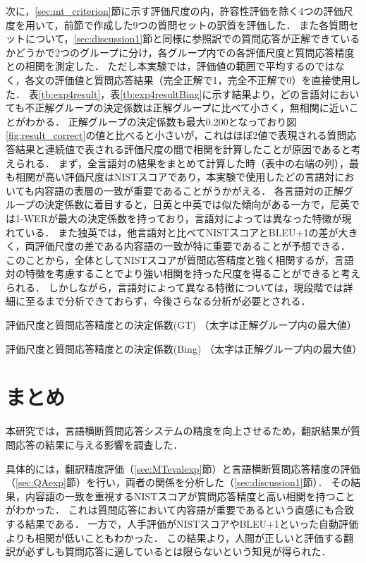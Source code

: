\documentclass[japanese]{jnlp_1.4}
\begin{document}
{次に，{\ref{sec:mt_criterion}}節に示す評価尺度の内，許容性評価を除く4つの評価尺度を用いて，前節で作成した9つの質問セットの訳質を評価した．
また各質問セットについて，{\ref{sec:discussion1}}節と同様に参照訳での質問応答が正解できているかどうかで2つのグループに分け，各グループ内での各評価尺度と質問応答精度との相関を測定した．
ただし本実験では，評価値の範囲で平均するのではなく，各文の評価値と質問応答結果（完全正解で1，完全不正解で0）を直接使用した．
表{\ref{tb:exp4result}}，表{\ref{tb:exp4resultBing}}に示す結果より，どの言語対においても不正解グループの決定係数は正解グループに比べて小さく，無相関に近いことがわかる．
正解グループの決定係数も最大0.200となっており図{\ref{fig:result_correct}}の値と比べると小さいが，これはほぼ2値で表現される質問応答結果と連続値で表される評価尺度の間で相関を計算したことが原因であると考えられる．
まず，全言語対の結果をまとめて計算した時（表中の右端の列），最も相関が高い評価尺度はNISTスコアであり，本実験で使用したどの言語対においても内容語の表層の一致が重要であることがうかがえる．
各言語対の正解グループの決定係数に着目すると，日英と中英では似た傾向がある一方で，尼英では1-WERが最大の決定係数を持っており，言語対によっては異なった特徴が現れている．
また独英では，他言語対と比べてNISTスコアとBLEU+1の差が大きく，両評価尺度の差である内容語の一致が特に重要であることが予想できる．
このことから，全体としてNISTスコアが質問応答精度と強く相関するが，言語対の特徴を考慮することでより強い相関を持った尺度を得ることができると考えられる．
しかしながら，言語対によって異なる特徴については，現段階では詳細に至るまで分析できておらず，今後さらなる分析が必要とされる．}

\begin{table}[t]
\caption{評価尺度と質問応答精度との決定係数(GT) （太字は正解グループ内の最大値）}
\label{tb:exp4result}

\end{table}
\begin{table}[t]
\caption{評価尺度と質問応答精度との決定係数(Bing) （太字は正解グループ内の最大値）}
\label{tb:exp4resultBing}

\end{table}


\section{まとめ} \label{sec:conclusion}

本研究では，言語横断質問応答システムの精度を向上させるため，翻訳結果が質問応答の結果に与える影響を調査した．


具体的には，翻訳精度評価（{\ref{sec:MTevalexp}}節）と言語横断質問応答精度の評価（{\ref{sec:QAexp}}節）を行い，両者の関係を分析した（{\ref{sec:discussion1}}節）．
その結果，内容語の一致を重視するNISTスコアが質問応答精度と高い相関を持つことがわかった．
これは質問応答において内容語が重要であるという直感にも合致する結果である．
一方で，人手評価がNISTスコアやBLEU+1といった自動評価よりも相関が低いこともわかった．
この結果より，人間が正しいと評価する翻訳が必ずしも質問応答に適しているとは限らないという知見が得られた．
\end{document}
